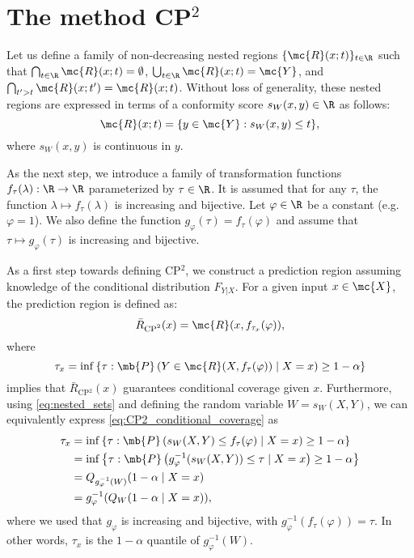 \section{The method CP$^2$}

Let us define a family of non-decreasing nested regions $\{\mc{R}(x; t)\}_{t \in \R}$ such that $\bigcap_{t \in \R} \mc{R}(x; t) = \emptyset$, $\bigcup_{t \in \R} \mc{R}(x; t) = \mc{Y}$, and $\bigcap_{t' > t} \mc{R}(x; t') = \mc{R}(x; t)$. Without loss of generality, these nested regions are expressed in terms of a conformity score $s_W(x, y) \in \R$ as follows:
\begin{equation}
  \mc{R}(x; t) = \{ y \in \mc{Y}: s_W(x, y) \leq t \},
  \label{eq:nested_sets}
\end{equation}
where $s_W(x, y)$ is continuous in $y$.

As the next step, we introduce a family of transformation functions $f_\tau(\lambda): \R \to \R$ parameterized by $\tau \in \R$. It is assumed that for any $\tau$, the function $\lambda \mapsto f_\tau(\lambda)$ is increasing and bijective.
Let $\varphi \in \R$ be a constant (e.g. $\varphi = 1$). We also define the function $g_\varphi(\tau) = f_\tau(\varphi)$ and assume that $\tau \mapsto g_\varphi(\tau)$ is increasing and bijective.

As a first step towards defining CP$^2$, we construct a prediction region assuming knowledge of the conditional distribution $F_{Y|X}$. For a given input $x \in \mc{X}$, the prediction region is defined as:
\begin{equation}
  \bar{R}_\text{CP$^2$}(x) = \mc{R}(x, f_{\tau_x}(\varphi)), \label{eq:rcp2}
\end{equation}
where
\begin{equation}
  \tau_x = \inf\left\{\tau: \mb{P}\left(Y \in \mc{R}(X, f_\tau(\varphi)) \mid X = x\right) \geq 1 - \alpha\right\} \label{eq:CP2_conditional_coverage}
\end{equation}
implies that $\bar{R}_\text{CP$^2$}(x)$ guarantees conditional coverage given $x$. Furthermore, using \eqref{eq:nested_sets} and defining the random variable $W = s_W(X, Y)$, we can equivalently express \eqref{eq:CP2_conditional_coverage} as 
\begin{align}
  \tau_x &= \inf\left\{\tau: \mb{P}\left(s_W(X, Y) \leq f_\tau(\varphi) \mid X=x\right) \geq 1 - \alpha\right\} \\
  &= \inf\left\{\tau: \mb{P}\left(g^{-1}_\varphi(s_W(X, Y)) \leq \tau \mid X=x\right) \geq 1 - \alpha\right\} \label{eq:quantile_CP_2_score_def} \\
 &= Q_{g^{-1}_\varphi(W)}(1 - \alpha \mid X = x) \\
  &= g^{-1}_\varphi(Q_W(1 - \alpha \mid X = x)), \label{eq:outer_quantile}
\end{align}
where we used that $g_\varphi$ is increasing and bijective, with $g^{-1}_\varphi(f_\tau(\varphi)) = \tau$. In other words, $\tau_x$ is the $1-\alpha$ quantile of $g^{-1}_\varphi(W)$.

